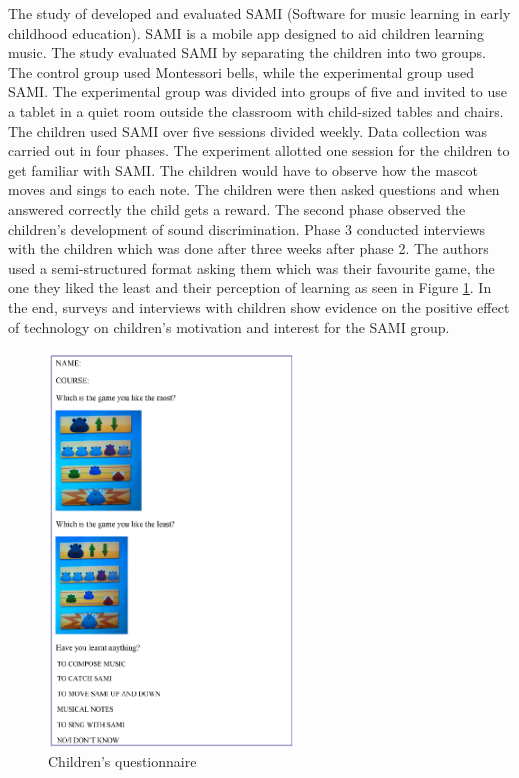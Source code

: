\newpage

The study of  developed and evaluated SAMI (Software for music learning in early childhood education). SAMI is a mobile app designed to aid children learning music. The study evaluated SAMI by separating the children into two groups. The control group used Montessori bells, while the experimental group used SAMI. The experimental group was divided into groups of five  and invited to use a tablet in a quiet room outside the classroom with child-sized tables and chairs. The children used SAMI over five sessions divided weekly. Data collection was carried out in four phases. The experiment allotted one session for the children to get familiar with SAMI. The children would have to observe how the mascot moves and sings to each note. The children were then asked questions and when answered correctly the child gets a reward. The second phase observed the children's development of sound discrimination. Phase 3 conducted interviews with the children which was done after three weeks after phase 2. The authors used a semi-structured format asking them which was their favourite game, the one they liked the least and their perception of learning as seen in Figure \ref{fig:children_questionnaire}. In the end, surveys and interviews with children show evidence on the positive effect of technology on children’s motivation and interest for the SAMI group.
\begin{figure}[H]
    \centering
    \includegraphics[width=6.5cm]{SAMI_Questionare.png}
    \caption{Children's questionnaire \protect\cite{paule2017music}} 
    \label{fig:children_questionnaire}
\end{figure}


